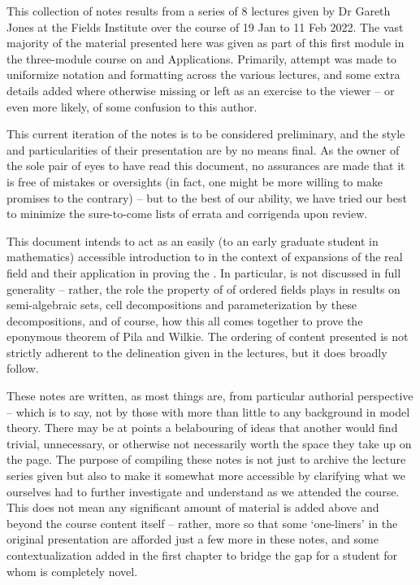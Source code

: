 %
%

\preface

This collection of notes results from a series of 8 lectures given by Dr Gareth Jones at the Fields Institute over the course of 19 Jan to 11 Feb 2022. The vast majority of the material presented here was given as part of this first module in the three-module course on \omy and Applications. Primarily, attempt was made to uniformize notation and formatting across the various lectures, and some extra details added where otherwise missing or left as an exercise to the viewer -- or even more likely, of some confusion to this author.

This current iteration of the notes is to be considered preliminary, and the style and particularities of their presentation are by no means final. As the owner of the sole pair of eyes to have read this document, no assurances are made that it is free of mistakes or oversights (in fact, one might be more willing to make promises to the contrary) -- but to the best of our ability, we have tried our best to minimize the sure-to-come lists of errata and corrigenda upon review.
 
This document intends to act as an easily (to an early graduate student in mathematics) accessible introduction to \omy in the context of expansions of the real field and their application in proving the \pwt. In particular, \omy is not discussed in full generality -- rather, the role the property of \omy of ordered fields plays in results on semi-algebraic sets, cell decompositions and parameterization by these decompositions, and of course, how this all comes together to prove the eponymous theorem of Pila and Wilkie. The ordering of content presented is not strictly adherent to the delineation given in the lectures, but it does broadly follow.

These notes are written, as most things are, from particular authorial perspective -- which is to say, not by those with more than little to any background in model theory. There may be at points a belabouring of ideas that another would find trivial, unnecessary, or otherwise not necessarily worth the space they take up on the page. The purpose of compiling these notes is not just to archive the lecture series given but also to make it somewhat more accessible by clarifying what we ourselves had to further investigate and understand as we attended the course. This does not mean any significant amount of material is added above and beyond the course content itself -- rather, more so that some `one-liners' in the original presentation are afforded just a few more in these notes, and some contextualization added in the first chapter to bridge the gap for a student for whom \omy is completely novel.

